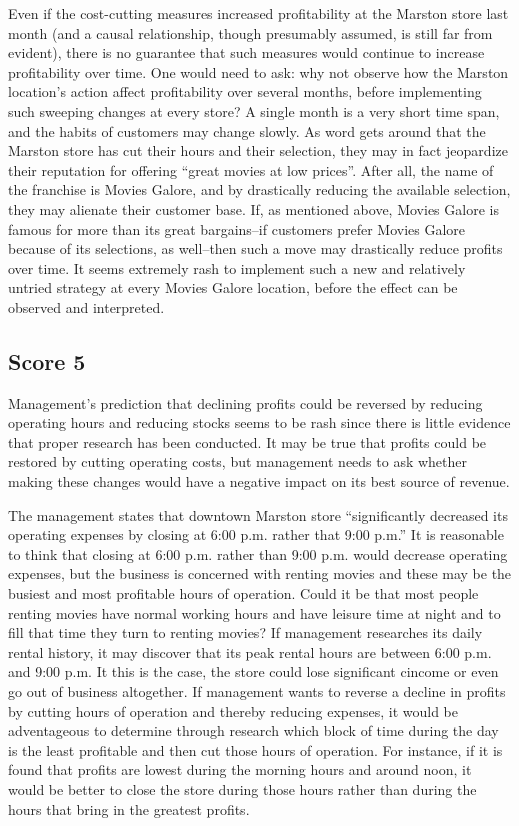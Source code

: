 Even if the cost-cutting measures increased profitability at the Marston store last month (and a causal relationship, though presumably assumed, is still far from evident), there is no guarantee that such measures would continue to increase profitability over time.
One would need to ask: why not observe how the Marston location's action affect profitability over several months, before implementing such sweeping changes at every store?
A single month is a very short time span, and the habits of customers may change slowly.
As word gets around that the Marston store has cut their hours and their selection, they may in fact jeopardize their reputation for offering ``great movies at low prices''.
After all, the name of the franchise is Movies Galore, and by drastically reducing the available selection, they may alienate their customer base.
If, as mentioned above, Movies Galore is famous for more than its great bargains--if customers prefer Movies Galore because of its selections, as well--then such a move may drastically reduce profits over time.
It seems extremely rash to implement such a new and relatively untried strategy at every Movies Galore location, before the effect can be observed and interpreted.

\subsection{Score 5}
Management's prediction that declining profits could be reversed by reducing operating hours and reducing stocks seems to be rash since there is little evidence that proper research has been conducted.
It may be true that profits could be restored by cutting operating costs, but management needs to ask whether making these changes would have a negative impact on its best source of revenue.

The management states that downtown Marston store ``significantly decreased its operating expenses by closing at 6:00 p.m. rather that 9:00 p.m.''
It is reasonable to think that closing at 6:00 p.m. rather than 9:00 p.m. would decrease operating expenses, but the business is concerned with renting movies and these may be the busiest and most profitable hours of operation.
Could it be that most people renting movies have normal working hours and have leisure time at night and to fill that time they turn to renting movies?
If management researches its daily rental history, it may discover that its peak rental hours are between 6:00 p.m. and 9:00 p.m.
It this is the case, the store could lose significant cincome or even go out of business altogether.
If management wants to reverse a decline in profits by cutting hours of operation and thereby reducing expenses, it would be adventageous to determine through research which block of time during the day is the least profitable and then cut those hours of operation.
For instance, if it is found that profits are lowest during the morning hours and around noon, it would be better to close the store during those hours rather than during the hours that bring in the greatest profits.

